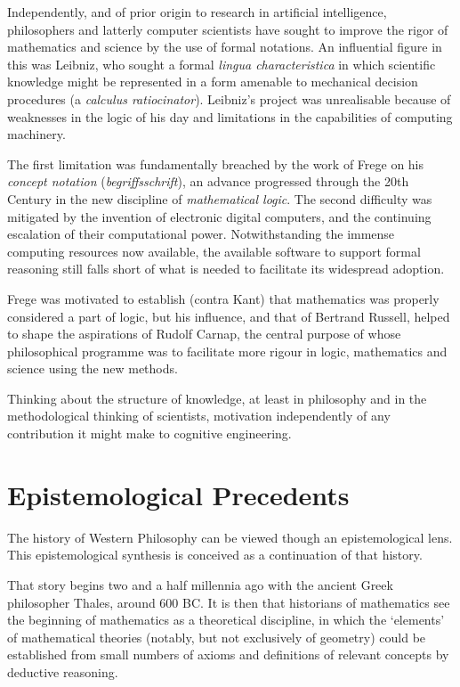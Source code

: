 \documentclass[10pt,titlepage]{book}
\begin{document}
Independently, and of prior origin to research in artificial intelligence, philosophers and latterly computer scientists have sought to improve the rigor of mathematics and science by the use of formal notations.
An influential figure in this was Leibniz, who sought a formal \emph{lingua characteristica} in which scientific knowledge might be represented in a form amenable to mechanical decision procedures (a \emph{calculus ratiocinator}).
Leibniz's project was unrealisable because of weaknesses in the logic of his day and limitations in the capabilities of computing machinery.

The first limitation was fundamentally breached by the work of Frege on his \emph{concept notation} (\emph{begriffsschrift}\cite{frege79}), an advance progressed through the 20th Century in the new discipline of \emph{mathematical logic}.
The second difficulty was mitigated by the invention of electronic digital computers, and the continuing escalation of their computational power.
Notwithstanding the immense computing resources now available, the available software to support formal reasoning still falls short of what is needed to facilitate its widespread adoption.

Frege was motivated to establish (contra Kant) that mathematics was properly considered a part of logic, but his influence, and that of Bertrand Russell, helped to shape the aspirations of Rudolf Carnap, the central purpose of whose philosophical programme was to facilitate more rigour in logic, mathematics and science using the new methods.

Thinking about the structure of knowledge, at least in philosophy and in the methodological thinking of scientists, motivation independently of any contribution it might make to cognitive engineering.

\section{Epistemological Precedents}

The history of Western Philosophy can be viewed though an epistemological lens.
This epistemological synthesis is conceived as a continuation of that history.

That story begins two and a half millennia ago with the ancient Greek philosopher Thales, around 600 BC.
It is then that historians of mathematics see the beginning of mathematics as a theoretical discipline, in which the `elements' of mathematical theories (notably, but not exclusively of geometry) could be established from small numbers of axioms and definitions of relevant concepts by deductive reasoning.
\end{document}
